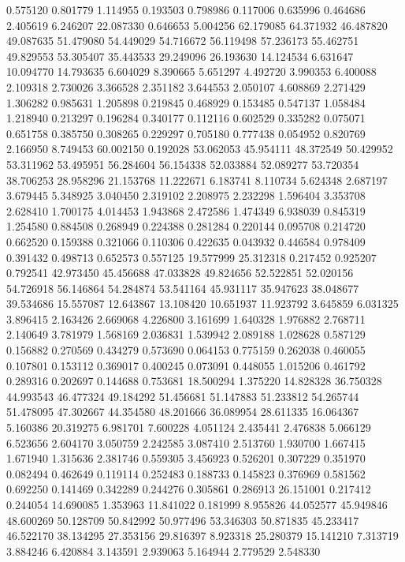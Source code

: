 0.575120
0.801779
1.114955
0.193503
0.798986
0.117006
0.635996
0.464686
2.405619
6.246207
22.087330
0.646653
5.004256
62.179085
64.371932
46.487820
49.087635
51.479080
54.449029
54.716672
56.119498
57.236173
55.462751
49.829553
53.305407
35.443533
29.249096
26.193630
14.124534
6.631647
10.094770
14.793635
6.604029
8.390665
5.651297
4.492720
3.990353
6.400088
2.109318
2.730026
3.366528
2.351182
3.644553
2.050107
4.608869
2.271429
1.306282
0.985631
1.205898
0.219845
0.468929
0.153485
0.547137
1.058484
1.218940
0.213297
0.196284
0.340177
0.112116
0.602529
0.335282
0.075071
0.651758
0.385750
0.308265
0.229297
0.705180
0.777438
0.054952
0.820769
2.166950
8.749453
60.002150
0.192028
53.062053
45.954111
48.372549
50.429952
53.311962
53.495951
56.284604
56.154338
52.033884
52.089277
53.720354
38.706253
28.958296
21.153768
11.222671
6.183741
8.110734
5.624348
2.687197
3.679445
5.348925
3.040450
2.319102
2.208975
2.232298
1.596404
3.353708
2.628410
1.700175
4.014453
1.943868
2.472586
1.474349
6.938039
0.845319
1.254580
0.884508
0.268949
0.224388
0.281284
0.220144
0.095708
0.214720
0.662520
0.159388
0.321066
0.110306
0.422635
0.043932
0.446584
0.978409
0.391432
0.498713
0.652573
0.557125
19.577999
25.312318
0.217452
0.925207
0.792541
42.973450
45.456688
47.033828
49.824656
52.522851
52.020156
54.726918
56.146864
54.284874
53.541164
45.931117
35.947623
38.048677
39.534686
15.557087
12.643867
13.108420
10.651937
11.923792
3.645859
6.031325
3.896415
2.163426
2.669068
4.226800
3.161699
1.640328
1.976882
2.768711
2.140649
3.781979
1.568169
2.036831
1.539942
2.089188
1.028628
0.587129
0.156882
0.270569
0.434279
0.573690
0.064153
0.775159
0.262038
0.460055
0.107801
0.153112
0.369017
0.400245
0.073091
0.448055
1.015206
0.461792
0.289316
0.202697
0.144688
0.753681
18.500294
1.375220
14.828328
36.750328
44.993543
46.477324
49.184292
51.456681
51.147883
51.233812
54.265744
51.478095
47.302667
44.354580
48.201666
36.089954
28.611335
16.064367
5.160386
20.319275
6.981701
7.600228
4.051124
2.435441
2.476838
5.066129
6.523656
2.604170
3.050759
2.242585
3.087410
2.513760
1.930700
1.667415
1.671940
1.315636
2.381746
0.559305
3.456923
0.526201
0.307229
0.351970
0.082494
0.462649
0.119114
0.252483
0.188733
0.145823
0.376969
0.581562
0.692250
0.141469
0.342289
0.244276
0.305861
0.286913
26.151001
0.217412
0.244054
14.690085
1.353963
11.841022
0.181999
8.955826
44.052577
45.949846
48.600269
50.128709
50.842992
50.977496
53.346303
50.871835
45.233417
46.522170
38.134295
27.353156
29.816397
8.923318
25.280379
15.141210
7.313719
3.884246
6.420884
3.143591
2.939063
5.164944
2.779529
2.548330
